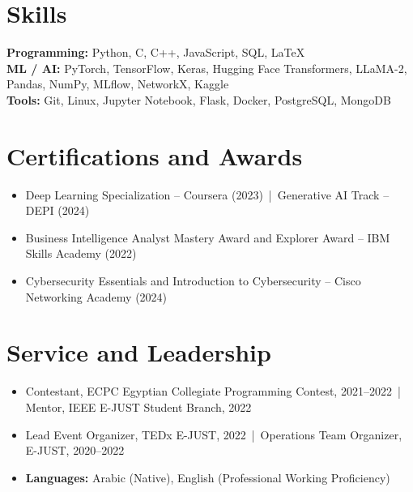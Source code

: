 \section{Skills}
\textbf{Programming:} Python, C, C++, JavaScript, SQL, LaTeX\\
\textbf{ML / AI:} PyTorch, TensorFlow, Keras, Hugging Face Transformers, LLaMA-2, Pandas, NumPy, MLflow, NetworkX, Kaggle\\
\textbf{Tools:} Git, Linux, Jupyter Notebook, Flask, Docker, PostgreSQL, MongoDB

\section{Certifications and Awards}
\begin{itemize}
  \item Deep Learning Specialization -- Coursera (2023) \,|\, Generative AI Track -- DEPI (2024)
  \item Business Intelligence Analyst Mastery Award and Explorer Award -- IBM Skills Academy (2022)
  \item Cybersecurity Essentials and Introduction to Cybersecurity -- Cisco Networking Academy (2024)
\end{itemize}

\section{Service and Leadership}
\begin{itemize}
  \item Contestant, ECPC Egyptian Collegiate Programming Contest, 2021--2022 \,|\, Mentor, IEEE E-JUST Student Branch, 2022
  \item Lead Event Organizer, TEDx E-JUST, 2022 \,|\, Operations Team Organizer, E-JUST, 2020--2022
  \item \textbf{Languages:} Arabic (Native), English (Professional Working Proficiency)
\end{itemize}

